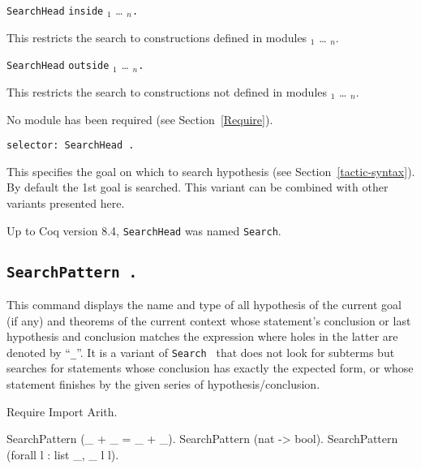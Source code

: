 \begin{Variants}
\item
{\tt SearchHead} {\term} {\tt inside} {\module$_1$} \ldots{} {\module$_n$}{\tt .}

This restricts the search to constructions defined in modules
{\module$_1$} \ldots{} {\module$_n$}.

\item {\tt SearchHead} {\term} {\tt outside} {\module$_1$} \ldots{} {\module$_n$}{\tt .}

This restricts the search to constructions not defined in modules
{\module$_1$} \ldots{} {\module$_n$}.

\begin{ErrMsgs}
\item {}
No module \module{} has been required (see Section~\ref{Require}).
\end{ErrMsgs}

\item {\tt selector: SearchHead {\term}.}

  This specifies the goal on which to search hypothesis (see
  Section~\ref{tactic-syntax}). By default the 1st goal is searched.
  This variant can be combined with other variants presented here.

\end{Variants}

\Warning Up to Coq version 8.4, {\tt SearchHead} was named {\tt Search}.

\subsection[\tt SearchPattern {\termpattern}.]{\tt SearchPattern {\term}.}

This command displays the name and type of all hypothesis of the
current goal (if any) and theorems of the current context whose statement's
conclusion or last hypothesis and conclusion matches the expression
{\term} where holes in the latter are denoted by ``{\texttt \_}''. It
is a variant of {\tt Search
  {\termpattern}} that does not look for subterms but searches for
statements whose conclusion has exactly the expected form, or whose
statement finishes by the given series of hypothesis/conclusion.

\begin{coq_example*}
Require Import Arith.
\end{coq_example*}
\begin{coq_example}
SearchPattern (_ + _ = _ + _).
SearchPattern (nat -> bool).
SearchPattern (forall l : list _, _ l l).
\end{coq_example}

